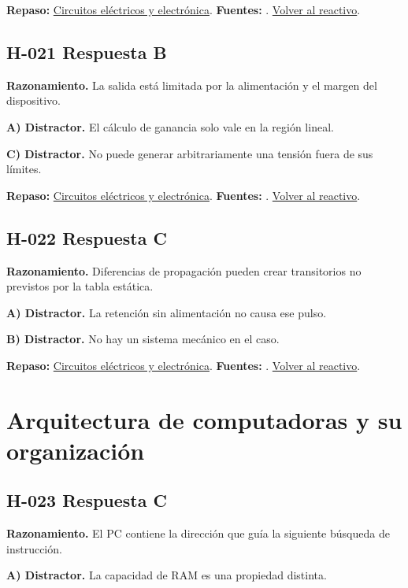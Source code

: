 \textbf{Repaso:} \hyperref[sec:h1]{Circuitos eléctricos y electrónica}. \textbf{Fuentes:} \cite{openstax,electronics,digital}. \hyperref[q:H-020]{Volver al reactivo}.\par\medskip

\subsection*{H-021 \quad Respuesta B}\label{s:H-021}
\textbf{Razonamiento.} La salida está limitada por la alimentación y el margen del dispositivo.

\textbf{A) Distractor. }El cálculo de ganancia solo vale en la región lineal.

\textbf{C) Distractor. }No puede generar arbitrariamente una tensión fuera de sus límites.

\textbf{Repaso:} \hyperref[sec:h1]{Circuitos eléctricos y electrónica}. \textbf{Fuentes:} \cite{openstax,electronics,digital}. \hyperref[q:H-021]{Volver al reactivo}.\par\medskip

\subsection*{H-022 \quad Respuesta C}\label{s:H-022}
\textbf{Razonamiento.} Diferencias de propagación pueden crear transitorios no previstos por la tabla estática.

\textbf{A) Distractor. }La retención sin alimentación no causa ese pulso.

\textbf{B) Distractor. }No hay un sistema mecánico en el caso.

\textbf{Repaso:} \hyperref[sec:h1]{Circuitos eléctricos y electrónica}. \textbf{Fuentes:} \cite{openstax,electronics,digital}. \hyperref[q:H-022]{Volver al reactivo}.\par\medskip

\section{Arquitectura de computadoras y su organización}

\subsection*{H-023 \quad Respuesta C}\label{s:H-023}
\textbf{Razonamiento.} El PC contiene la dirección que guía la siguiente búsqueda de instrucción.

\textbf{A) Distractor. }La capacidad de RAM es una propiedad distinta.

